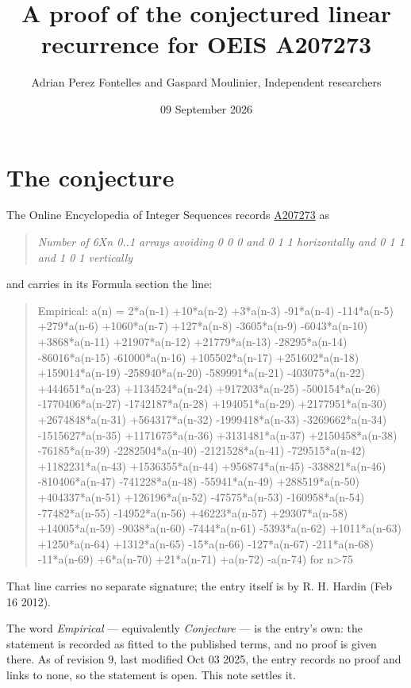 \documentclass[11pt]{article}
\title{A proof of the conjectured linear recurrence for OEIS A207273}
\author{Adrian Perez Fontelles and Gaspard Moulinier, Independent researchers}
\date{09 September 2026}
\theoremstyle{definition}
\begin{document}
\maketitle
\section{The conjecture}

The Online Encyclopedia of Integer Sequences records \href{https://oeis.org/A207273}{A207273} as

\begin{quote}\itshape Number of 6Xn 0..1 arrays avoiding 0 0 0 and 0 1 1 horizontally and 0 1 1 and 1 0 1 vertically\end{quote}

and carries in its Formula section the line:

\begin{quote}\ttfamily Empirical: a(n) = 2*a(n-1) +10*a(n-2) +3*a(n-3) -91*a(n-4) -114*a(n-5) +279*a(n-6) +1060*a(n-7) +127*a(n-8) -3605*a(n-9) -6043*a(n-10) +3868*a(n-11) +21907*a(n-12) +21779*a(n-13) -28295*a(n-14) -86016*a(n-15) -61000*a(n-16) +105502*a(n-17) +251602*a(n-18) +159014*a(n-19) -258940*a(n-20) -589991*a(n-21) -403075*a(n-22) +444651*a(n-23) +1134524*a(n-24) +917203*a(n-25) -500154*a(n-26) -1770406*a(n-27) -1742187*a(n-28) +194051*a(n-29) +2177951*a(n-30) +2674848*a(n-31) +564317*a(n-32) -1999418*a(n-33) -3269662*a(n-34) -1515627*a(n-35) +1171675*a(n-36) +3131481*a(n-37) +2150458*a(n-38) -76185*a(n-39) -2282504*a(n-40) -2121528*a(n-41) -729515*a(n-42) +1182231*a(n-43) +1536355*a(n-44) +956874*a(n-45) -338821*a(n-46) -810406*a(n-47) -741228*a(n-48) -55941*a(n-49) +288519*a(n-50) +404337*a(n-51) +126196*a(n-52) -47575*a(n-53) -160958*a(n-54) -77482*a(n-55) -14952*a(n-56) +46223*a(n-57) +29307*a(n-58) +14005*a(n-59) -9038*a(n-60) -7444*a(n-61) -5393*a(n-62) +1011*a(n-63) +1250*a(n-64) +1312*a(n-65) -15*a(n-66) -127*a(n-67) -211*a(n-68) -11*a(n-69) +6*a(n-70) +21*a(n-71) +a(n-72) -a(n-74) for n>75\end{quote}

That line carries no separate signature; the entry itself is by R. H. Hardin (Feb 16 2012).

The word {\itshape Empirical} --- equivalently {\itshape Conjecture} --- is the entry's own: the statement is recorded as fitted to the published terms, and no proof is given there. As of revision 9, last modified Oct 03 2025, the entry records no proof and links to none, so the statement is open. This note settles it.
\end{document}

